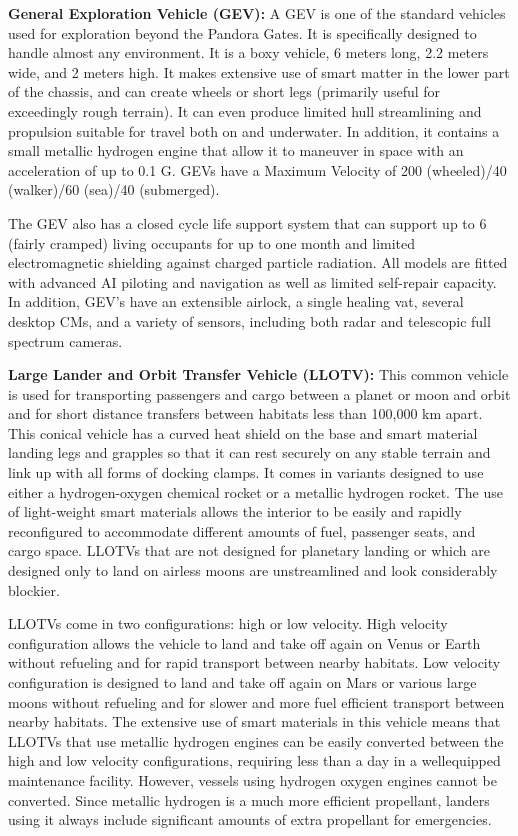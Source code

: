 \textbf{General Exploration Vehicle (GEV):} A GEV is one of the standard vehicles used for exploration beyond the Pandora Gates. It is specifically designed to handle almost any environment. It is a boxy vehicle, 6 meters long, 2.2 meters wide, and 2 meters high. It makes extensive use of smart matter in the lower part of the chassis, and can create wheels or short legs (primarily useful for exceedingly rough terrain). It can even produce limited hull streamlining and propulsion suitable for travel both on and underwater. In addition, it contains a small metallic hydrogen engine that allow it to maneuver in space with an acceleration of up to 0.1 G. GEVs have a Maximum Velocity of 200 (wheeled)/40 (walker)/60 (sea)/40 (submerged). 

The GEV also has a closed cycle life support system that can support up to 6 (fairly cramped) living occupants for up to one month and limited electromagnetic shielding against charged particle radiation. All models are fitted with advanced AI piloting and navigation as well as limited self-repair capacity. In addition, GEV’s have an extensible airlock, a single healing vat, several desktop CMs, and a variety of sensors, including both radar and telescopic full spectrum cameras. 

\textbf{Large Lander and Orbit Transfer Vehicle (LLOTV):} This common vehicle is used for transporting passengers and cargo between a planet or moon and orbit and for short distance transfers between habitats less than 100,000 km apart. This conical vehicle has a curved heat shield on the base and smart material landing legs and grapples so that it can rest securely on any stable terrain and link up with all forms of docking clamps. It comes in variants designed to use either a hydrogen-oxygen chemical rocket or a metallic hydrogen rocket. The use of light-weight smart materials allows the interior to be easily and rapidly reconfigured to accommodate different amounts of fuel, passenger seats, and cargo space. LLOTVs that are not designed for planetary landing or which are designed only to land on airless moons are unstreamlined and look considerably blockier. 

LLOTVs come in two configurations: high or low velocity. High velocity configuration allows the vehicle to land and take off again on Venus or Earth without refueling and for rapid transport between nearby habitats. Low velocity configuration is designed to land and take off again on Mars or various large moons without refueling and for slower and more fuel efficient transport between nearby habitats. The extensive use of smart materials in this vehicle means that LLOTVs that use metallic hydrogen engines can be easily converted between the high and low velocity configurations, requiring less than a day in a wellequipped maintenance facility. However, vessels using hydrogen oxygen engines cannot be converted. Since metallic hydrogen is a much more efficient propellant, landers using it always include significant amounts of extra propellant for emergencies. 

